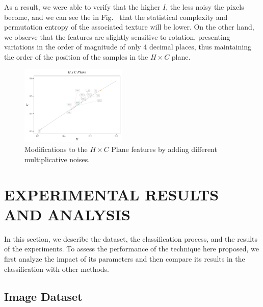 \documentclass[journal]{IEEEtran}
\begin{document}
As a result, we were able to verify that the higher $I$, the less noisy the pixels become, and we can see the in Fig.~ that the statistical complexity and permutation entropy of the associated texture will be lower.
On the other hand, we observe that the features are slightly sensitive to rotation, presenting variations in the order of magnitude of only 4 decimal places, thus maintaining the order of the position of the samples in the $H \times C$ plane.

\begin{figure}[hbt]
	\includegraphics[width=0.45\textwidth]{Figures/waves1.pdf}
	\caption{Modifications to the $H \times C$ Plane features by adding different multiplicative noises.}
	\label{fig:speckleHC}
\end{figure}

\section{EXPERIMENTAL RESULTS AND ANALYSIS}\label{Results}

In this section, we describe the dataset, 
the classification process, and 
the results of the experiments.
To assess the performance of the technique here proposed, we first analyze the impact of its parameters and then compare its results in the classification with other methods.

\subsection{Image Dataset}
\end{document}
